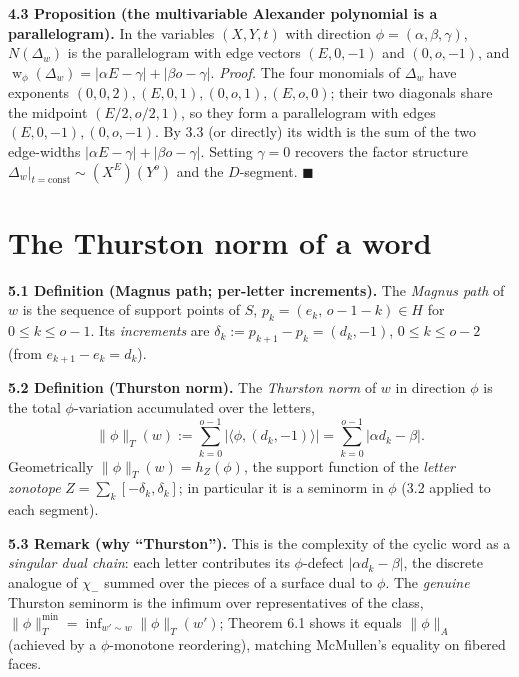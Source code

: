 \documentclass[11pt]{article}
\begin{document}
\medskip
\textbf{4.3 Proposition (the multivariable Alexander polynomial is a parallelogram).}
In the variables $(X,Y,t)$ with direction $\phi=(\alpha,\beta,\gamma)$, $N(\Delta_w)$ is
the parallelogram with edge vectors $(E,0,-1)$ and $(0,o,-1)$, and
$\operatorname{w}_\phi(\Delta_w)=|\alpha E-\gamma|+|\beta o-\gamma|$.
\emph{Proof.} The four monomials of $\Delta_w$ have exponents
$(0,0,2),(E,0,1),(0,o,1),(E,o,0)$; their two diagonals share the midpoint
$(E/2,o/2,1)$, so they form a parallelogram with edges $(E,0,-1),(0,o,-1)$. By 3.3 (or
directly) its width is the sum of the two edge-widths $|\alpha E-\gamma|+|\beta o-\gamma|$.
Setting $\gamma=0$ recovers the factor structure
$\Delta_w|_{t=\text{const}}\sim (X^E)(Y^o)$ and the $D$-segment. \hfill$\blacksquare$

\hrulefill

\section{The Thurston norm of a word}

\textbf{5.1 Definition (Magnus path; per-letter increments).} The \emph{Magnus path} of
$w$ is the sequence of support points of $S$, $p_k=(e_k,\,o-1-k)\in H$ for
$0\le k\le o-1$. Its \emph{increments} are $\delta_k:=p_{k+1}-p_k=(d_k,-1)$,
$0\le k\le o-2$ (from $e_{k+1}-e_k=d_k$).

\medskip
\textbf{5.2 Definition (Thurston norm).} The \emph{Thurston norm} of $w$ in direction
$\phi$ is the total $\phi$-variation accumulated over the letters,
\[
\lVert\phi\rVert_{T}(w):=\sum_{k=0}^{o-1}\big|\langle\phi,(d_k,-1)\rangle\big|
=\sum_{k=0}^{o-1}|\alpha d_k-\beta|.
\]
Geometrically $\lVert\phi\rVert_T(w)=h_Z(\phi)$, the support function of the
\emph{letter zonotope} $Z=\sum_{k}[-\delta_k,\delta_k]$; in particular it is a seminorm
in $\phi$ (3.2 applied to each segment).

\medskip
\textbf{5.3 Remark (why ``Thurston'').} This is the complexity of the cyclic word as a
\emph{singular dual chain}: each letter contributes its $\phi$-defect
$|\alpha d_k-\beta|$, the discrete analogue of $\chi_-$ summed over the pieces of a
surface dual to $\phi$. The \emph{genuine} Thurston seminorm is the infimum over
representatives of the class, $\lVert\phi\rVert_T^{\min}=\inf_{w'\sim w}\lVert\phi\rVert_T(w')$;
Theorem 6.1 shows it equals $\lVert\phi\rVert_A$ (achieved by a $\phi$-monotone
reordering), matching McMullen's equality on fibered faces.

\hrulefill
\end{document}
